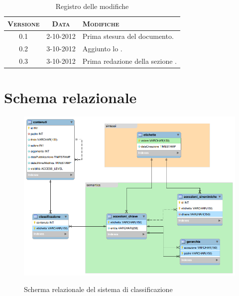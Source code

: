 \documentclass[10pt,a4paper,headinclude,footinclude,hidelinks]{scrreprt} %
\begin{document}
    \title{\rmfamily\normalfont{}}
    \author{}
    \date{\today}
    
    \maketitle
    
    \begin{abstract}
        \noindent Il documento presenta il modello relazionale per l'integrazione dei nuovi criteri di classificazione nella piattaforma.
    \end{abstract}
    
	\begin{table}[ht]
	\centering
	\begin{tabular}{|c|c|l|}
	\hline
	\textsc{Versione} & \textsc{Data} & \textsc{Modifiche} \\ \hline
	0.1 & 2-10-2012 & Prima stesura del documento. \\ \hline
	0.2 & 3-10-2012 & Aggiunto lo \nameref{gfx:schema-relazionale}. \\ \hline
	0.3 & 3-10-2012 & Prima redazione della sezione \nameref{ch:stage:er:operazioni}. \\ \hline
	\end{tabular}
	\caption{Registro delle modifiche}
	\label{tab:stage:wp:workload}
	\end{table}

	\tableofcontents

	\chapter{Schema relazionale}
	\label{ch:stage:er:schema}

	\begin{figure}[ht]
		\begin{center}
	    	\includegraphics[width=14cm]{modello-er.png}
			\label{gfx:schema-relazionale}
			\caption{Scherma relazionale del sistema di classificazione}
		\end{center}
	\end{figure}
\end{document}
